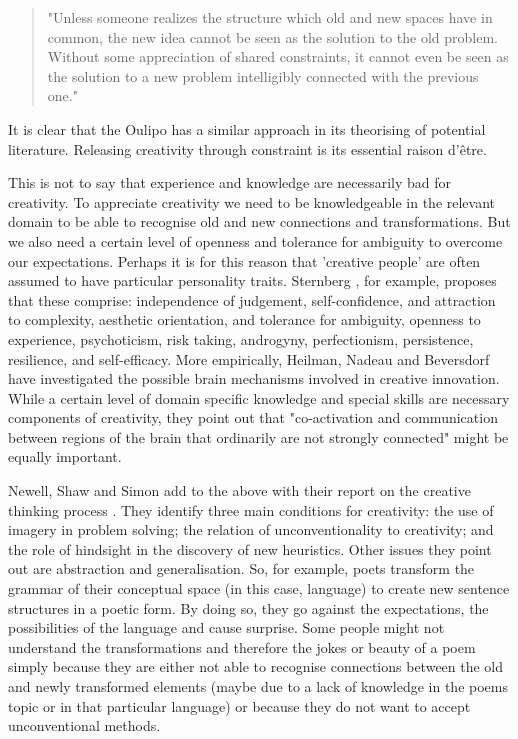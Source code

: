 \begin{quote}
  "Unless someone realizes the structure which old and new spaces have in common, the new idea cannot be seen as the solution to the old problem. Without some appreciation of shared constraints, it cannot even be seen as the solution to a new problem intelligibly connected with the previous one." \citep[p.84]{Boden2003}
\end{quote}

It is clear that the Oulipo has a similar approach in its theorising of potential literature. Releasing creativity through constraint is its essential raison d'être.

This is not to say that experience and knowledge are necessarily bad for creativity. To appreciate creativity we need to be knowledgeable in the relevant domain to be able to recognise old and new connections and transformations. But we also need a certain level of openness and tolerance for ambiguity to overcome our expectations. Perhaps it is for this reason that 'creative people' are often assumed to have particular personality traits. Sternberg \citep{Sternberg1999, Sternberg1999}, for example, proposes that these comprise: independence of judgement, self-confidence, and attraction to complexity, aesthetic orientation, and tolerance for ambiguity, openness to experience, psychoticism, risk taking, androgyny, perfectionism, persistence, resilience, and self-efficacy. More empirically, Heilman, Nadeau and Beversdorf \citep{Heilman2003} have investigated the possible brain mechanisms involved in creative innovation. While a certain level of domain specific knowledge and special skills are necessary components of creativity, they point out that "co-activation and communication between regions of the brain that ordinarily are not strongly connected" might be equally important.

Newell, Shaw and Simon add to the above with their report on the creative thinking process \citep{Newell1963}. They identify three main conditions for creativity: the use of imagery in problem solving; the relation of unconventionality to creativity; and the role of hindsight in the discovery of new heuristics. Other issues they point out are abstraction and generalisation. So, for example, poets transform the grammar of their conceptual space (in this case, language) to create new sentence structures in a poetic form. By doing so, they go against the expectations, the possibilities of the language and cause surprise. Some people might not understand the transformations and therefore the jokes or beauty of a poem simply because they are either not able to recognise connections between the old and newly transformed elements (maybe due to a lack of knowledge in the poems topic or in that particular language) or because they do not want to accept unconventional methods.

